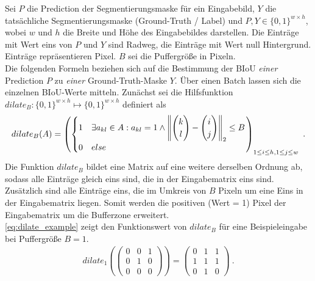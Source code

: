 Sei $P$ die Prediction der Segmentierungsmaske für ein Eingabebild, $Y$ die tatsächliche Segmentierungsmaske (Ground-Truth / Label)
und $P, Y \in \{0, 1\}^{w{\times}h}$, wobei $w$ und $h$ die Breite und Höhe des Eingabebildes darstellen.
Die Einträge mit Wert eins von $P$ und $Y$ sind Radweg, die Einträge mit Wert null Hintergrund. Einträge repräsentieren Pixel.
$B$ sei die Puffergröße in Pixeln. \\
Die folgenden Formeln beziehen sich auf die Bestimmung der \ac{BIoU} \textit{einer} Prediction $P$ zu \textit{einer} Ground-Truth-Maske $Y$. 
Über einen Batch lassen sich die einzelnen \ac{BIoU}-Werte mitteln. 
Zunächst sei die Hilfsfunktion $dilate_B: \{0,1\}^{w{\times}h} \mapsto \{0,1\}^{w{\times}h}$ definiert als 
\begin{align}
	\label{eq:dilate} dilate_B(A) = \left( \begin{cases} 
		1 & \exists a_{kl} \in A: a_{kl} = 1 \land \left\lVert
			\begin{pmatrix} k \\ l \end{pmatrix} - \begin{pmatrix} i \\ j \end{pmatrix} \right\rVert_2 \leq B \\
		0 & else 
	\end{cases} \right)_{1 \leq i \leq h, 1 \leq j \leq w}~.
\end{align}
Die Funktion $dilate_B$ bildet eine Matrix auf eine weitere derselben Ordnung ab, 
sodass alle Einträge gleich eins sind, die in der Eingabematrix eins sind. Zusätzlich sind alle Einträge eins, 
die im Umkreis von $B$ Pixeln um eine Eins in der Eingabematrix liegen. Somit werden die positiven (Wert = 1)
Pixel der Eingabematrix um die Bufferzone erweitert.  \\
\autoref{eq:dilate_example} zeigt den Funktionswert von $dilate_B$ für eine Beispieleingabe 
bei Puffergröße $B=1$.
\begin{align}
	\label{eq:dilate_example} dilate_1\left(\begin{pmatrix} 
	0 & 0 & 1 \\ 
	0 & 1 & 0 \\ 
	0 & 0 & 0 
	\end{pmatrix}\right) = \begin{pmatrix} 
	0 & 1 & 1 \\ 
	1 & 1 & 1 \\ 
	0 & 1 & 0 
	\end{pmatrix}~.
\end{align}
